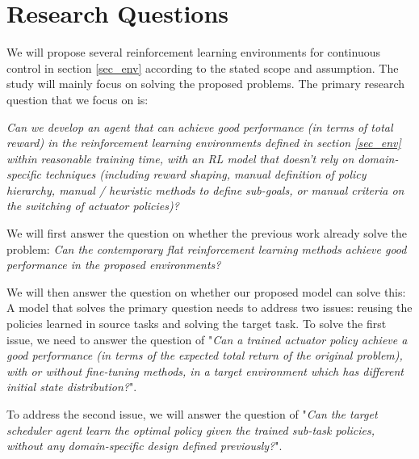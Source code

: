 \section{Research Questions}

We will propose several reinforcement learning environments for continuous control in section \ref{sec_env} according to the stated scope and assumption. The study will mainly focus on solving the proposed problems.
The primary research question that we focus on is:
\begin{center}
    \textit{Can we develop an agent that can achieve good performance (in terms of total reward) in the reinforcement learning environments defined in section \ref{sec_env} within reasonable training time, with an RL model that doesn't rely on domain-specific techniques (including reward shaping, manual definition of policy hierarchy, manual / heuristic methods to define sub-goals, or manual criteria on the switching of actuator policies)?}
\end{center}

We will first answer the question on whether the previous work already solve the problem: \textit{Can the contemporary flat reinforcement learning methods achieve good performance in the proposed environments?}


We will then answer the question on whether our proposed model can solve this:
A model that solves the primary question needs to address two issues: reusing the policies learned in source tasks and solving the target task.
To solve the first issue, we need to answer the question of "\textit{Can a trained actuator policy achieve a good performance (in terms of the expected total return of the original problem), with or without fine-tuning methods, in a target environment which has different initial state distribution?}".

To address the second issue, we will answer the question of "\textit{Can the target scheduler agent learn the optimal policy given the trained sub-task policies, without any domain-specific design defined previously?}".

